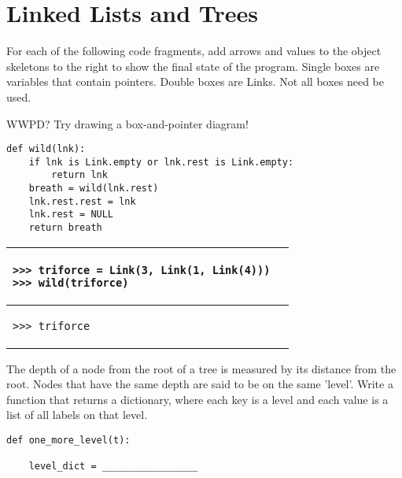 \documentclass{exam}
\begin{document}
\section{Linked Lists and Trees}
\begin{questions}
\item For each of the following code fragments, add arrows and values to the object skeletons to the right to show the final state of the program. Single boxes are variables that contain pointers. Double boxes are Links. Not all boxes need be used.\\
\begin{center}
\vspace{1cm}
\vspace{5cm}
\end{center}

\clearpage

\item WWPD? Try drawing a box-and-pointer diagram!
\begin{lstlisting}
def wild(lnk):
    if lnk is Link.empty or lnk.rest is Link.empty:
        return lnk
    breath = wild(lnk.rest)
    lnk.rest.rest = lnk
    lnk.rest = NULL
    return breath
\end{lstlisting}

\begin{center}
\begin{tabular}{ |p{8cm}|p{6cm}| } 
 \hline
 \begin{lstlisting}
>>> triforce = Link(3, Link(1, Link(4)))
>>> wild(triforce)
\end{lstlisting} &  \\  \hline
 \begin{lstlisting}
>>> triforce
\end{lstlisting} &  \\  \hline
\end{tabular}
\end{center}

\item The depth of a node from the root of a tree is measured by its distance from the root. Nodes that have the same depth are said to be on the same 'level'. 
Write a function that returns a dictionary, where each key is a level and each value is a list of all labels on that level. 
 \begin{lstlisting}
def one_more_level(t):

    level_dict = _________________
    

\end{lstlisting}
\end{questions}
\end{document}
